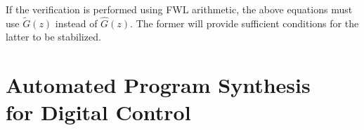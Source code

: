 \documentclass[final]{sig-alternate-05-2015}
\newcommand{\red}[1]{{\color{red}#1}}
\begin{document}
If the verification is performed using FWL arithmetic,  the above equations
must use $\tilde{G}(z)$ instead of $\hat{G}(z)$.  The former will provide
sufficient conditions for the latter to be stabilized.


 








\section{Automated Program Synthesis \\ for Digital
Control}\label{sec:synthesis}
\end{document}

